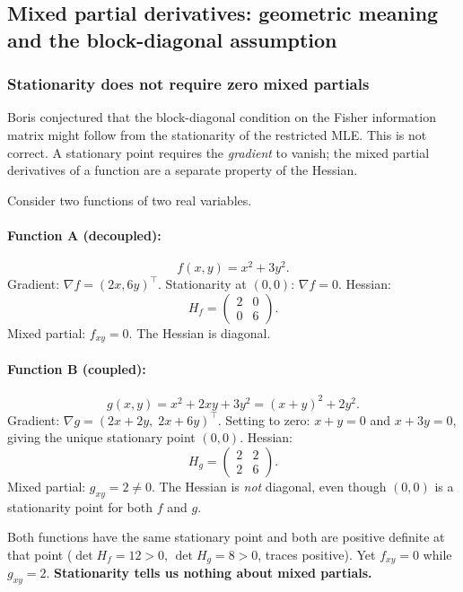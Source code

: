 \documentclass[a4paper,oneside,12pt]{extarticle}
\theoremstyle{plain}
\theoremstyle{definition}
\theoremstyle{remark}
\begin{document}

\subsection{Mixed partial derivatives: geometric meaning and the block-diagonal assumption}
\label{subsec:mixed-partials}

\subsubsection*{Stationarity does not require zero mixed partials}

Boris conjectured that the block-diagonal condition on the Fisher
information matrix might follow from the stationarity of the
restricted MLE.  This is not correct.  A stationary point requires
the \emph{gradient} to vanish; the mixed partial derivatives of a
function are a separate property of the Hessian.

Consider two functions of two real variables.

\paragraph{Function A (decoupled):}
\[
  f(x,y) = x^2 + 3y^2.
\]
Gradient: $\nabla f = (2x, 6y)^\top$.  Stationarity at $(0,0)$:
$\nabla f = 0$.  Hessian:
\[
  H_f = \begin{pmatrix} 2 & 0 \\ 0 & 6 \end{pmatrix}.
\]
Mixed partial: $f_{xy} = 0$.  The Hessian is diagonal.

\paragraph{Function B (coupled):}
\[
  g(x,y) = x^2 + 2xy + 3y^2 = (x+y)^2 + 2y^2.
\]
Gradient: $\nabla g = (2x+2y,\; 2x+6y)^\top$.  Setting to zero:
$x+y=0$ and $x+3y=0$, giving the unique stationary point $(0,0)$.
Hessian:
\[
  H_g = \begin{pmatrix} 2 & 2 \\ 2 & 6 \end{pmatrix}.
\]
Mixed partial: $g_{xy} = 2 \neq 0$.  The Hessian is \emph{not}
diagonal, even though $(0,0)$ is a stationarity point for both
$f$ and $g$.

Both functions have the same stationary point and both are positive
definite at that point ($\det H_f = 12 > 0$, $\det H_g = 8 > 0$,
traces positive).  Yet $f_{xy} = 0$ while $g_{xy} = 2$.
\textbf{Stationarity tells us nothing about mixed partials.}
\end{document}
